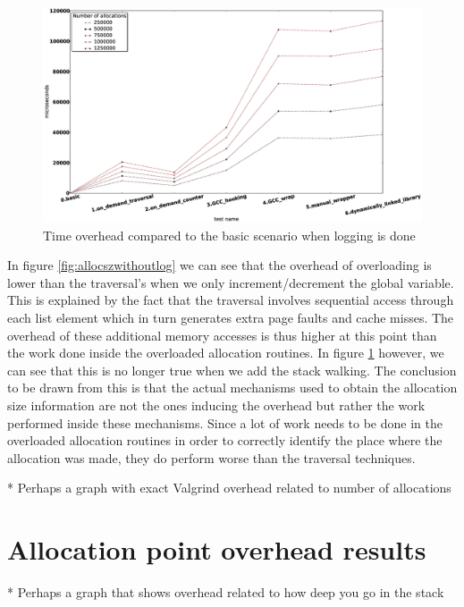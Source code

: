 \begin{figure}[htb]
\centering
\includegraphics[scale=0.5, width=\textwidth]{src/img/allocationsizewithlogging}
\caption{Time overhead compared to the basic scenario when logging is done}
\label{fig:allocszwithlog}
\end{figure}

In figure \ref{fig:allocszwithoutlog} we can see that the overhead of overloading is lower than the traversal's when we only increment/decrement the global variable. This is explained by the fact that the traversal involves sequential access through each list element which in turn generates extra page faults and cache misses. The overhead of these additional memory accesses is thus higher at this point than the work done inside the overloaded allocation routines. In figure \ref{fig:allocszwithlog} however, we can see that this is no longer true when we add the stack walking. The conclusion to be drawn from this is that the actual mechanisms used to obtain the allocation size information are not the ones inducing the overhead but rather the work performed inside these mechanisms. Since a lot of work needs to be done in the overloaded allocation routines in order to correctly identify the place where the allocation was made, they do perform worse than the traversal techniques.

* Perhaps a graph with exact Valgrind overhead related to number of allocations

\section{Allocation point overhead results}
\label{section:allocpt}

* Perhaps a graph that shows overhead related to how deep you go in the stack

